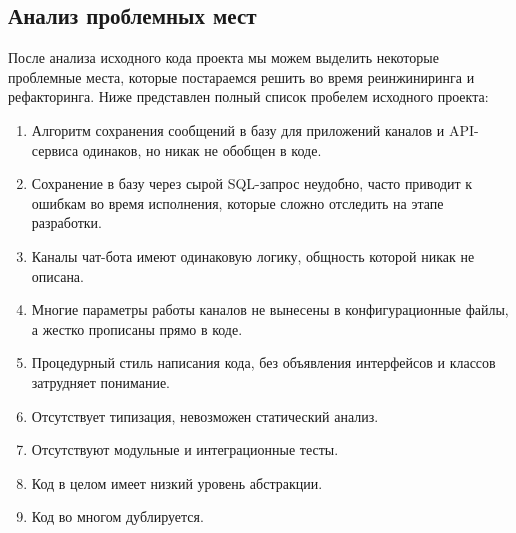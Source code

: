     \subsection{Анализ проблемных мест}
    После анализа исходного кода проекта мы можем выделить некоторые проблемные места, которые постараемся решить во время
    реинжиниринга и рефакторинга. Ниже представлен полный список пробелем исходного проекта:
    \begin{enumerate}
        \item Алгоритм сохранения сообщений в базу для приложений каналов и API-сервиса одинаков, но никак не обобщен в коде.
        \item Сохранение в базу через сырой SQL-запрос неудобно, часто приводит
        к ошибкам во время исполнения, которые сложно отследить на этапе разработки.
        \item Каналы чат-бота имеют одинаковую логику, общность которой никак не описана. 
        \item Многие параметры работы каналов не вынесены в конфигурационные файлы, а жестко прописаны прямо в коде.
        \item Процедурный стиль написания кода, без объявления интерфейсов и классов затрудняет понимание.
        \item Отсутствует типизация, невозможен статический анализ.
        \item Отсутствуют модульные и интеграционные тесты.
        \item Код в целом имеет низкий уровень абстракции.
        \item Код во многом дублируется.
    \end{enumerate}

